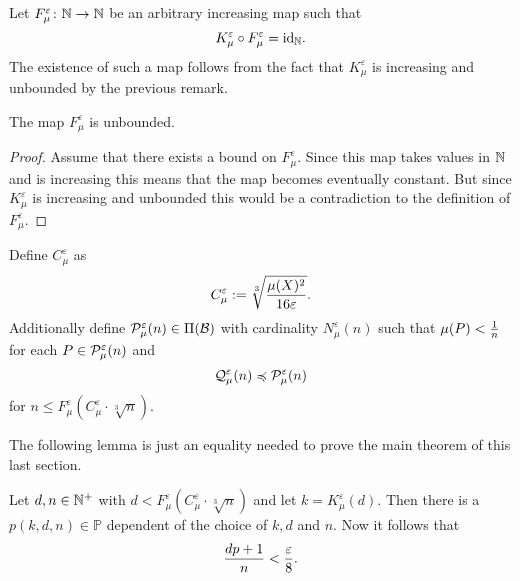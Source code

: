\begin{defin}
  Let $F_\mu^\varepsilon\colon \N \to \N$ be an arbitrary increasing map such that \[K_\mu^\varepsilon \circ F_\mu^\varepsilon = \id_\N.\] The existence of such a map follows from the fact that $K_\mu^\varepsilon$ is increasing and unbounded by the previous remark.
\end{defin}

\begin{lemma}
  The map $F_\mu^\varepsilon$ is unbounded.
\end{lemma}

\begin{proof}
  Assume that there exists a bound on $F_\mu^\varepsilon$. Since this map takes values in $\N$ and is increasing this means that the map becomes eventually constant. But since $K_\mu^\varepsilon$ is increasing and unbounded this would be a contradiction to the definition of $F_\mu^\varepsilon$.
\end{proof}

\begin{defin}
  Define $C_\mu^\varepsilon$ as \[C_\mu^\varepsilon := \sqrt[3]{\mu(X)^2 \over 16\varepsilon}.\]
  Additionally define $\P^\varepsilon_\mu(n) \in \Pi(\mathcal{B})$ with cardinality $N_\mu^\varepsilon(n)$ such that $\mu(P) < {1 \over n}$ for each $P \in \P_\mu^\varepsilon(n)$ and \[\Q_\mu^\varepsilon(n) \preccurlyeq \P^\varepsilon_\mu(n)\] for $n \leq F_\mu^\varepsilon(C_\mu^\varepsilon \cdot \sqrt[3]{n})$. 
\end{defin}

The following lemma is just an equality needed to prove the main theorem of this last section.
\begin{lemma}\label{lem:approxK}
  Let $d,n \in \N^+$ with $d < F_\mu^\varepsilon(C_\mu^\varepsilon \cdot \sqrt[3]{n})$ and let $k = K_\mu^\varepsilon(d)$. Then there is a $p(k,d,n) \in \mathbb{P}$ dependent of the choice of $k, d$ and $n$. Now it follows that \[{dp +1 \over n} < {\varepsilon \over 8}.\]
\end{lemma}

